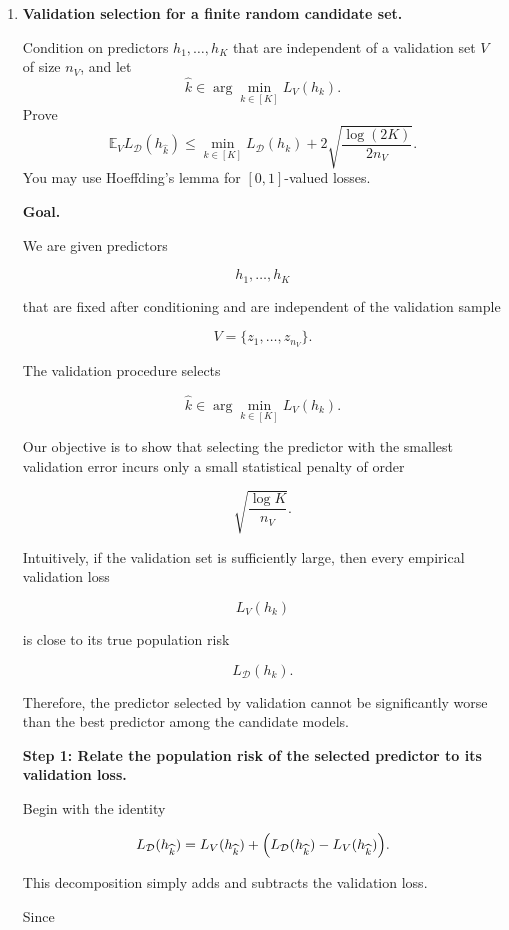 \documentclass[11pt]{article}
\newcommand{\E}{\mathbb{E}}
\begin{document}
\begin{enumerate}

\item \textbf{Validation selection for a finite random candidate set.}

Condition on predictors $h_1,\ldots,h_K$ that are independent of a validation set $V$ of size $n_V$, and let
\[
\widehat k\in\arg\min_{k\in[K]}L_V(h_k).
\]
Prove
\[
\E_V L_{\mathcal D}(h_{\widehat k})
\le
\min_{k\in[K]}L_{\mathcal D}(h_k)
+
2\sqrt{\frac{\log(2K)}{2n_V}}.
\]
You may use Hoeffding's lemma for $[0,1]$-valued losses.

\begin{solutionbox}

\textbf{Goal.}

We are given predictors

\[
h_1,\ldots,h_K
\]

that are fixed after conditioning and are independent of the validation sample

\[
V=\{z_1,\ldots,z_{n_V}\}.
\]

The validation procedure selects

\[
\widehat{k}
\in
\arg\min_{k\in[K]}
L_V(h_k).
\]

Our objective is to show that selecting the predictor with the smallest validation error incurs only a small statistical penalty of order

\[
\sqrt{\frac{\log K}{n_V}}.
\]

Intuitively, if the validation set is sufficiently large, then every empirical validation loss

\[
L_V(h_k)
\]

is close to its true population risk

\[
L_{\mathcal D}(h_k).
\]

Therefore, the predictor selected by validation cannot be significantly worse than the best predictor among the candidate models.

\medskip

\textbf{Step 1: Relate the population risk of the selected predictor to its validation loss.}

Begin with the identity

\[
L_{\mathcal D}(h_{\widehat{k}})
=
L_V(h_{\widehat{k}})
+
\Bigl(
L_{\mathcal D}(h_{\widehat{k}})
-
L_V(h_{\widehat{k}})
\Bigr).
\]

This decomposition simply adds and subtracts the validation loss.

Since


\end{solutionbox}
\end{enumerate}
\end{document}
